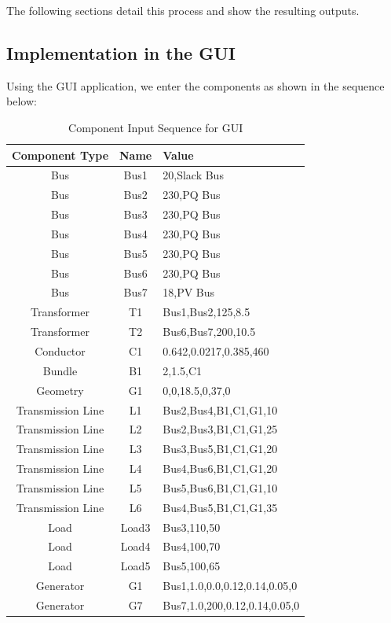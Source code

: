\documentclass{article}
\begin{document}
	The following sections detail this process and show the resulting outputs.
	
	\subsection{Implementation in the GUI}
	
	Using the GUI application, we enter the components as shown in the sequence below:
	
	\begin{table}[H]
		\centering
		\begin{tabular}{ccl}
			\hline
			\textbf{Component Type} & \textbf{Name} & \textbf{Value} \\
			\hline
			Bus & Bus1 & 20,Slack Bus \\
			Bus & Bus2 & 230,PQ Bus \\
			Bus & Bus3 & 230,PQ Bus \\
			Bus & Bus4 & 230,PQ Bus \\
			Bus & Bus5 & 230,PQ Bus \\
			Bus & Bus6 & 230,PQ Bus \\
			Bus & Bus7 & 18,PV Bus \\
			Transformer & T1 & Bus1,Bus2,125,8.5 \\
			Transformer & T2 & Bus6,Bus7,200,10.5 \\
			Conductor & C1 & 0.642,0.0217,0.385,460 \\
			Bundle & B1 & 2,1.5,C1 \\
			Geometry & G1 & 0,0,18.5,0,37,0 \\
			Transmission Line & L1 & Bus2,Bus4,B1,C1,G1,10 \\
			Transmission Line & L2 & Bus2,Bus3,B1,C1,G1,25 \\
			Transmission Line & L3 & Bus3,Bus5,B1,C1,G1,20 \\
			Transmission Line & L4 & Bus4,Bus6,B1,C1,G1,20 \\
			Transmission Line & L5 & Bus5,Bus6,B1,C1,G1,10 \\
			Transmission Line & L6 & Bus4,Bus5,B1,C1,G1,35 \\
			Load & Load3 & Bus3,110,50 \\
			Load & Load4 & Bus4,100,70 \\
			Load & Load5 & Bus5,100,65 \\
			Generator & G1 & Bus1,1.0,0.0,0.12,0.14,0.05,0 \\
			Generator & G7 & Bus7,1.0,200,0.12,0.14,0.05,0 \\
			\hline
		\end{tabular}
		\caption{Component Input Sequence for GUI}
		\label{tab:gui_inputs}
	\end{table}
	
\end{document}
